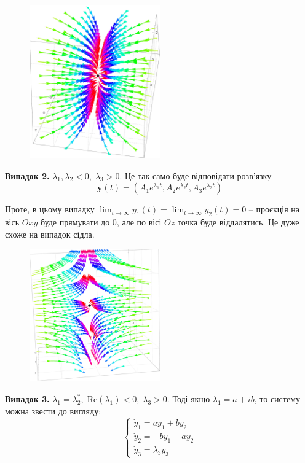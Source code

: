 \documentclass[oneside,solution]{tmpl}
\begin{document}
\begin{figure}[H]
    \centering
    \includegraphics[width=0.5\textwidth]{images/hw_8/case_1.pdf}
\end{figure}

\textbf{Випадок 2.} $\lambda_1, \lambda_2 < 0, \; \lambda_3 > 0$. Це так само буде відповідати розв'язку
\begin{equation}
    \mathbf{y}(t) = (A_1e^{\lambda_1 t}, A_2e^{\lambda_2 t}, A_3e^{\lambda_3 t})
\end{equation}

Проте, в цьому випадку $\lim_{t \to \infty}y_1(t) = \lim_{t \to \infty}y_2(t) = 0$ -- проєкція на вісь $Oxy$ буде прямувати до $0$, але по вісі $Oz$ точка буде віддалятись. Це дуже схоже на випадок сідла. 
\begin{figure}[H]
    \centering
    \includegraphics[width=0.5\textwidth]{images/hw_8/case_2.pdf}
\end{figure}

\textbf{Випадок 3.} $\lambda_1 = \lambda_2^*, \; \text{Re}(\lambda_1)<0, \; \lambda_3 > 0$. Тоді якщо $\lambda_1 = a+ib$, то систему можна звести до вигляду:
\begin{equation}
    \begin{cases}
        \dot{y}_1 = ay_1 + by_2 \\
        \dot{y}_2 = -by_1 + ay_2 \\
        \dot{y}_3 = \lambda_3 y_3
    \end{cases}
\end{equation}
\end{document}
